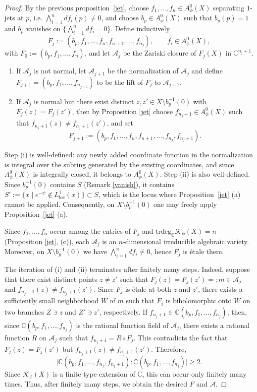 \documentclass[a4paper, 12pt]{article}
\newcommand{\bC}{\mathbb{C}}
\newcommand{\cK}{\mathcal{K}}
\newcommand{\cA}{\mathcal{A}}
\newcommand{\loc}{\mathrm{loc}}
\newcommand{\trdeg}{\mathrm{trdeg}}
\begin{document}
\begin{proof}
By the previous proposition~\ref{jet}, choose $f_1,\dots,f_n\in A_\phi^0(X)$ separating $1$-jets at $p$, i.e.
$\bigwedge_{i=1}^n df_i(p)\neq 0$, and choose $b_p\in A_\phi^0(X)$ such that $b_p(p)=1$ and
$b_p$ vanishes on $\{\bigwedge_{i=1}^n df_i=0\}$.
Define inductively
\[
F_{j}:=(b_p,f_1,\dots,f_n,f_{n+1},\dots,f_{n_j}),\qquad f_i\in A_\phi^0(X),
\]
with $F_{0}:=(b_p,f_1,\dots,f_n)$, and let $\cA_j$ be the Zariski closure of $F_j(X)$ in $\mathbb{C}^{n_j+1}$.
\begin{enumerate}
\item[(i)] If $\cA_j$ is not normal, let $\cA_{j+1}$ be the normalization of $\cA_{j}$ and define
$F_{j+1}=(b_p,f_1,\dots,f_{n_{j+1}})$ to be the lift of $F_{j}$ to $\cA_{j+1}$.

\item[(ii)] If $\cA_{j}$ is normal but there exist distinct $z,z'\in X\setminus b_p^{-1}(0)$ with
$F_{j}(z)=F_{j}(z')$, then by Proposition \ref{jet} choose $f_{n_j+1}\in A_\phi^0(X)$ such that
$f_{n_j+1}(z)\neq f_{n_j+1}(z')$, and set
\[
F_{j+1}:=(b_p,f_1,\dots,f_n,f_{n+1},\dots,f_{n_j},f_{n_j+1}).
\]
\end{enumerate}

Step (i) is well-defined: any newly added coordinate function in the normalization is integral over the subring generated by the existing coordinates, and since $A_\phi^0(X)$ is integrally closed, it belongs to $A_\phi^0(X)$. Step (ii) is also well-defined. Since $b_p^{-1}(0)$ contains $S$ (Remark \ref{vanish}), it contains $S' := \{x \mid e^{-\psi}\notin L^1_\loc(x)\} \subset S$, which is the locus where Proposition~\ref{jet} (a) cannot be applied. Consequently, on $X \setminus b_p^{-1}(0)$ one may freely apply Proposition~\ref{jet} (a).

Since $f_1,\dots,f_n$ occur among the entries of $F_{j}$ and $\trdeg_{\mathbb{C}}\cK_\phi(X)=n$ (Proposition \ref{jet}, (c)),
each $\cA_{j}$ is an $n$-dimensional irreducible algebraic variety.
Moreover, on $X\setminus b_p^{-1}(0)$ we have $\bigwedge_{i=1}^n df_i\neq 0$, hence $F_{j}$ is \'{e}tale there.

The iteration of (i) and (ii) terminates after finitely many steps.
Indeed, suppose that there exist distinct points $z\neq z'$ such that $F_j(z)=F_j(z')=:m\in \cA_j$ and $f_{n_j+1}(z)\neq f_{n_j+1}(z')$. Since $F_j$ is \'etale at both $z$ and $z'$, there exists a sufficiently small neighborhood $W$ of $m$ such that $F_j$ is biholomorphic onto $W$ on two branches $Z\ni z$ and $Z'\ni z'$, respectively. If $f_{n_j+1}\in \bC(b_p,f_1,\dots,f_{n_j})$, then, since $\bC(b_p,f_1,\dots,f_{n_j})$ is the rational function field of $\cA_j$, there exists a rational function $R$ on $\cA_j$ such that $f_{n_j+1}=R\circ F_j$. This contradicts the fact that $F_j(z)=F_j(z')$ but $f_{n_j+1}(z)\neq f_{n_j+1}(z')$. Therefore,
\[
\bigl[\bC(b_p,f_1,\dots,f_{n_j},f_{n_j+1}):\bC(b_p,f_1,\dots,f_{n_j})\bigr]\ge 2.
\]
Since $\cK_\phi(X)$ is a finite type extension of $\mathbb{C}$, this can occur only finitely many times. Thus, after finitely many steps, we obtain the desired $F$ and $\cA$.
\end{proof}
\end{document}
